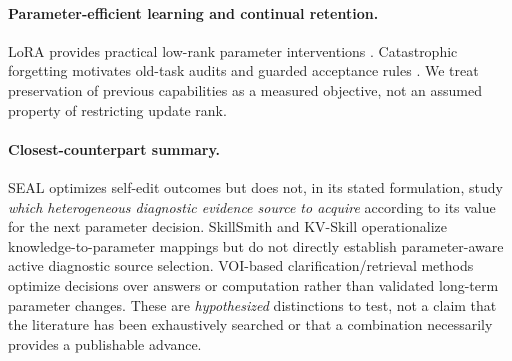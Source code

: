 \paragraph{Parameter-efficient learning and continual retention.}
LoRA provides practical low-rank parameter interventions
\citep{hu2021lora}. Catastrophic forgetting motivates old-task audits
and guarded acceptance rules \citep{kirkpatrick2017overcoming}.
We treat preservation of previous capabilities as a measured objective,
not an assumed property of restricting update rank.

\paragraph{Closest-counterpart summary.}
SEAL optimizes self-edit outcomes but does not, in its stated formulation,
study \emph{which heterogeneous diagnostic evidence source to acquire}
according to its value for the next parameter decision. SkillSmith and
KV-Skill operationalize knowledge-to-parameter mappings but do not
directly establish parameter-aware active diagnostic source selection.
VOI-based clarification/retrieval methods optimize decisions over answers
or computation rather than validated long-term parameter changes.
These are \emph{hypothesized} distinctions to test, not a claim that
the literature has been exhaustively searched or that a combination
necessarily provides a publishable advance.
